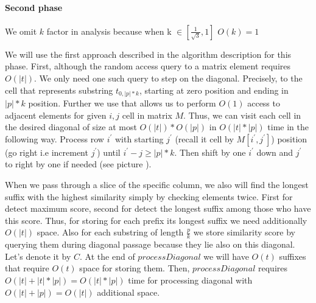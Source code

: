   





\paragraph{Second phase}
We omit $k$ factor in analysis because when k $\in [\frac{1}{\sqrt{3}},1]$ $O(k) = 1$

We will use the first approach described in the algorithm description for this phase.
First, although the random access query to a matrix element requires $O(|t|)$.
We only need one such query to step on the diagonal.
Precisely, to the cell that represents substring $t_{0,|p|*k}$, starting at zero position and ending in $|p|*k$ position.  
Further we use  that allows us to perform $O(1)$ access to adjacent elements for given $i,j$ cell in matrix $M$.
Thus, we can visit each cell in the desired diagonal of size at most $O(|t|) * O(|p|) $ in $O(|t|*|p|)$ time in the following way.
Process row $i^{'}$ with starting $j^{'}$ (recall it cell by $M[i^{'},j^{'}]$) position  (go right i.e increment $j^{'}$) until $i^{'}-j \geq |p|*k$.
Then shift by one $i^{'}$ down and $j^{'}$ to right by one if needed (see picture ).

When we pass through a slice of the specific column, we also will find the longest suffix with the highest similarity simply by checking elements twice.
First for detect maximum score, second for detect the longest suffix among those who have this score.
Thus, for storing for each prefix its longest suffix we need additionally $O(|t|)$ space.
Also for each substring of length $\frac{p}{k}$ we store similarity score by querying them during diagonal passage because they lie also on this diagonal.
Let's denote it by $C$. 
At the end of  $processDiagonal$ we will have $O(t)$ suffixes that require $O(t)$  space for storing them.
Then, $processDiagonal$ requires $O(|t|+|t|*|p|)=O(|t|*|p|)$ time for processing diagonal with $O(|t|+|p|)=O(|t|)$ additional space.
 
